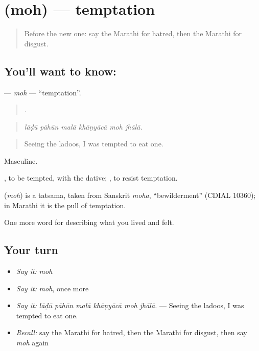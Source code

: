 \section[\texorpdfstring{\mr{मोह} (moh)}{मोह (moh)}]{ (moh) — temptation}

\label{lesson:MR-C462-moh}



\begin{quote}
Before the new one: say the Marathi for hatred, then the Marathi for disgust.
\end{quote}

\subsection*{You'll want to know: }
\textbf{} — \emph{moh} — \textquotedblleft{}temptation\textquotedblright{}.

\begin{quote}
     .
\end{quote}

\begin{quote}
\emph{lāḍū pāhūn malā khāṇyācā moh jhālā.}
\end{quote}

\begin{quote}
Seeing the ladoos, I was tempted to eat one.
\end{quote}

Masculine.

 , to be tempted, with the dative;  , to resist temptation.

\begin{cousinweb}
\textbf{} (\emph{moh}) is a tatsama, taken from Sanskrit \emph{moha}, \textquotedblleft{}bewilderment\textquotedblright{} (CDIAL 10360); in Marathi it is the pull of temptation.
\end{cousinweb}

\begin{grammarlens}[title={What you've built}]
One more word for describing what you lived and felt.
\end{grammarlens}

\subsection*{Your turn}
\begin{itemize}
\raggedright
  \item \emph{Say it:} \emph{moh}
  \item \emph{Say it:} \emph{moh}, once more
  \item \emph{Say it:} \emph{lāḍū pāhūn malā khāṇyācā moh jhālā.} — Seeing the ladoos, I was tempted to eat one.
  \item \emph{Recall:} say the Marathi for hatred, then the Marathi for disgust, then say \emph{moh} again
\end{itemize}

